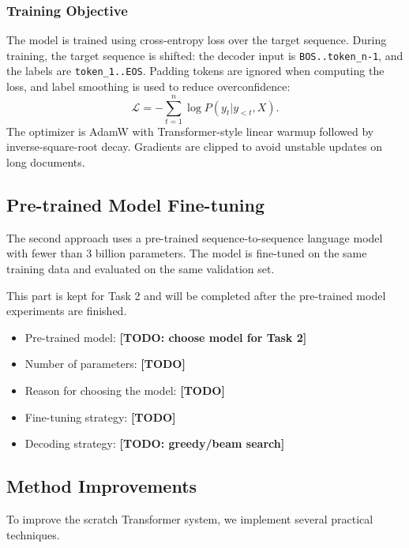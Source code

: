 \documentclass[conference]{IEEEtran}
\begin{document}
\subsubsection{Training Objective}
The model is trained using cross-entropy loss over the target sequence. During training, the target sequence is shifted: the decoder input is \texttt{BOS..token\_n-1}, and the labels are \texttt{token\_1..EOS}. Padding tokens are ignored when computing the loss, and label smoothing is used to reduce overconfidence:
\begin{equation}
\mathcal{L} = -\sum_{t=1}^{n} \log P(y_t | y_{<t}, X).
\end{equation}
The optimizer is AdamW with Transformer-style linear warmup followed by inverse-square-root decay. Gradients are clipped to avoid unstable updates on long documents.

\subsection{Pre-trained Model Fine-tuning}
The second approach uses a pre-trained sequence-to-sequence language model with fewer than 3 billion parameters. The model is fine-tuned on the same training data and evaluated on the same validation set.

This part is kept for Task 2 and will be completed after the pre-trained model experiments are finished.
\begin{itemize}
    \item Pre-trained model: \textbf{[TODO: choose model for Task 2]}
    \item Number of parameters: \textbf{[TODO]}
    \item Reason for choosing the model: \textbf{[TODO]}
    \item Fine-tuning strategy: \textbf{[TODO]}
    \item Decoding strategy: \textbf{[TODO: greedy/beam search]}
\end{itemize}

\subsection{Method Improvements}
To improve the scratch Transformer system, we implement several practical techniques.
\end{document}

